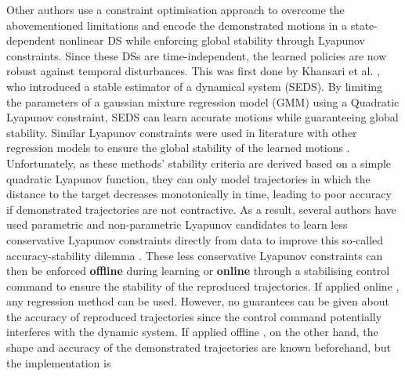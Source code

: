 Other authors use a constraint optimisation approach to overcome the abovementioned limitations and encode the demonstrated motions in a state-dependent nonlinear DS while enforcing global stability through Lyapunov constraints. Since these DSs are time-independent, the learned policies are now robust against temporal disturbances. This was first done by Khansari et al. \cite{khansari-zadehLearningStableNonlinear2011}, who introduced a stable estimator of a dynamical system (SEDS). By limiting the parameters of a gaussian mixture regression model (GMM) using a Quadratic Lyapunov constraint, SEDS can learn accurate motions while guaranteeing global stability. Similar Lyapunov constraints were used in literature with other regression models to ensure the global stability of the learned motions \cite{lemmeNeurallyImprintedStable2013,huNeuralLearningStable2015,umlauftLearningStableStochastic2017,umlauftLearningStableGaussian2017,medinaLearningStableTask2017,duanFastStableLearning2019,xuRobotTrajectoryTracking2019,umlauftLearningStochasticallyStable2020,ledererGaussianProcessBasedRealTime2021,xuLearningBasedKinematicControl2022,salehiLearningDiscreteTimeUncertain2022,davoodiRuleBasedSafeProbabilistic2022}. Unfortunately, as these methods' stability criteria are derived based on a simple quadratic Lyapunov function, they can only model trajectories in which the distance to the target decreases monotonically in time, leading to poor accuracy if demonstrated trajectories are not contractive. As a result, several authors have used parametric and non-parametric Lyapunov candidates to learn less conservative Lyapunov constraints directly from data to improve this so-called accuracy-stability dilemma \cite{khansari-zadehLearningControlLyapunov2014,neumannNeuralLearningStable2013,lemmeNeuralLearningVector2014,umlauftLearningStableGaussian2017,umlauftUncertaintybasedControlLyapunov2018,duttaLearningStableMovement2018,umlauftUncertaintybasedHumanMotion2019,duttaSkillLearningHuman2021,ravanbakhshLearningControlLyapunov2019,ravanbakhshFormalPolicyLearning2019,umlauftLearningStochasticallyStable2020,xiaoLearningStableNonparametric2020,tesfazgiInverseReinforcementLearning2021,coulombeGeneratingStableCollisionFree2022}. These less conservative Lyapunov constraints can then be enforced \textbf{offline} during learning or \textbf{online} through a stabilising control command to ensure the stability of the reproduced trajectories. If applied online \cite{khansari-zadehLearningControlLyapunov2014,umlauftLearningStableGaussian2017,umlauftUncertaintybasedControlLyapunov2018,duttaLearningStableMovement2018,umlauftUncertaintybasedHumanMotion2019,ravanbakhshFormalPolicyLearning2019,ravanbakhshLearningControlLyapunov2019,xiaoLearningStableNonparametric2020,duttaSkillLearningHuman2021,umlauftLearningStochasticallyStable2020}, any regression method can be used. However, no guarantees can be given about the accuracy of reproduced trajectories since the control command potentially interferes with the dynamic system. If applied offline \cite{neumannNeuralLearningStable2013,lemmeNeuralLearningVector2014,tesfazgiInverseReinforcementLearning2021,coulombeGeneratingStableCollisionFree2022}, on the other hand, the shape and accuracy of the demonstrated trajectories are known beforehand, but the implementation is 